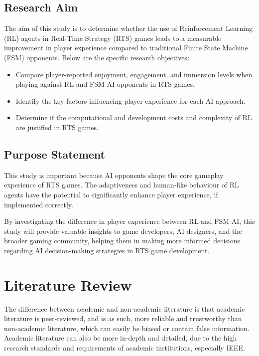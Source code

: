 \documentclass[conference]{IEEEtran}
\begin{document}
\subsection{Research Aim}

The aim of this study is to determine whether the use of Reinforcement Learning (RL) agents in Real-Time Strategy (RTS) games leads to a measurable improvement in player experience compared to traditional
Finite State Machine (FSM) opponents. Below are the specific research objectives:

\begin{itemize}
	\item Compare player-reported enjoyment, engagement, and immersion levels when playing against RL and FSM AI opponents in RTS games.
	\item Identify the key factors influencing player experience for each AI approach.
	\item Determine if the computational and development costs and complexity of RL are justified in RTS games.
\end{itemize}

\subsection{Purpose Statement}

This study is important because AI opponents shape the core gameplay experience of RTS games. The adaptiveness and human-like behaviour of RL agents have the potential to
significantly enhance player experience, if implemented correctly.

By investigating the difference in player experience between RL and FSM AI, this study will provide valuable insights to game developers, AI designers, and the broader gaming community, helping them
in making more informed decisions regarding AI decision-making strategies in RTS game development.

\section{Literature Review}

The difference between academic and non-academic literature is that academic literature is peer-reviewed, and is as such, more reliable and trustworthy
than non-academic literature, which can easily be biased or contain false information. Academic literature can also be more in-depth and detailed, due to
the high research standards and requirements of academic institutions, especially IEEE.
\end{document}
